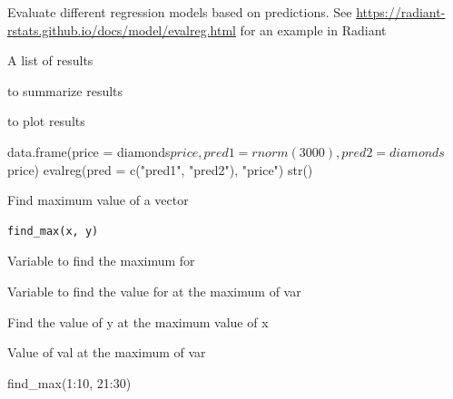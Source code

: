 \documentclass[a4paper]{book}
\begin{document}
%
\begin{Details}
Evaluate different regression models based on predictions. See \url{https://radiant-rstats.github.io/docs/model/evalreg.html} for an example in Radiant
\end{Details}
%
\begin{Value}
A list of results
\end{Value}
%
\begin{SeeAlso}
 to summarize results

 to plot results
\end{SeeAlso}
%
\begin{Examples}
\begin{ExampleCode}
data.frame(price = diamonds$price, pred1 = rnorm(3000), pred2 = diamonds$price) %
  evalreg(pred = c("pred1", "pred2"), "price") %
  str()

\end{ExampleCode}
\end{Examples}
%
\begin{Description}
Find maximum value of a vector
\end{Description}
%
\begin{Usage}
\begin{verbatim}
find_max(x, y)
\end{verbatim}
\end{Usage}
%
\begin{Arguments}
\begin{ldescription}
\item[\code{x}] Variable to find the maximum for

\item[\code{y}] Variable to find the value for at the maximum of var
\end{ldescription}
\end{Arguments}
%
\begin{Details}
Find the value of y at the maximum value of x
\end{Details}
%
\begin{Value}
Value of val at the maximum of var
\end{Value}
%
\begin{Examples}
\begin{ExampleCode}
find_max(1:10, 21:30)

\end{ExampleCode}
\end{Examples}
\end{document}
